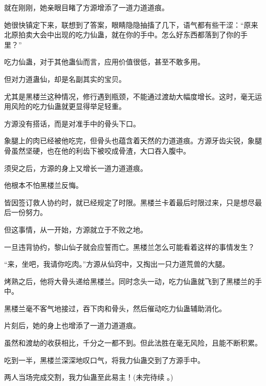 \begin{this_body}
就在刚刚，她亲眼目睹了方源增添了一道力道道痕。

她很快镇定下来，联想到了答案，眼睛隐隐抽搐了几下，语气都有些干涩：“原来北原拍卖大会中出现的吃力仙蛊，就在你的手中。怎么好东西都落到了你的手里？”

吃力仙蛊，对于其他蛊仙而言，应用价值很低，甚至不敢多用。

但对力道蛊仙，却是名副其实的宝贝。

尤其是黑楼兰这种情况，修行遇到瓶颈，不能通过渡劫大幅度增长。这时，毫无运用风险的吃力仙蛊就更显得举足轻重。

方源没有搭话，而是对准手中的骨头下口。

象腿上的肉已经被他吃完，但骨头也蕴含着天然的力道道痕。方源牙齿尖锐，象腿骨虽然坚硬，也在他的利齿下被咬成骨渣，大口吞入腹中。

须臾之后，方源的身上又增长一道力道道痕。

他根本不怕黑楼兰反悔。

皆因签订救人协约时，就已经规定了时限。黑楼兰卡着最后时限过来，只是想尽最后一份努力。

但这事情，从一开始，方源就立于不败之地。

一旦违背协约，黎山仙子就会应誓而亡。黑楼兰怎么可能看着这样的事情发生？

“来，坐吧，我请你吃肉。”方源从仙窍中，又掏出一只力道荒兽的大腿。

烤熟之后，他将大骨头递给黑楼兰。同时念头一动，吃力仙蛊就飞到了黑楼兰的手中。

黑楼兰毫不客气地接过，吞下肉和骨头，然后催动吃力仙蛊辅助消化。

片刻后，她的身上也增添了一道力道道痕。

虽然和渡劫的收获相比，千分之一都不到。但此法胜在毫无风险，且能不断积累。

吃到一半，黑楼兰深深地叹口气，将我力仙蛊交到了方源手中。

两人当场完成交割，我力仙蛊至此易主！(未完待续 。)

\end{this_body}

